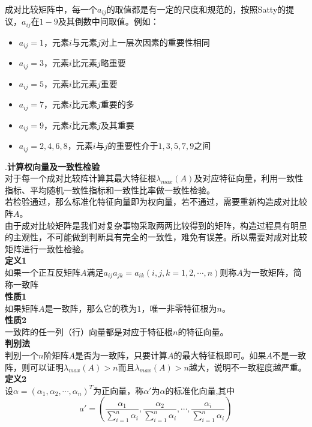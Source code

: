 \documentclass[openany]{progbookcn}
\begin{document}
\indent 成对比较矩阵中，每一个$a_{ij}$的取值都是有一定的尺度和规范的，按照Satty的提议，$a_{ij}$在$1-9$及其倒数中间取值。例如：
\begin{itemize}
\item $a_{ij}=1$，元素$i$与元素$j$对上一层次因素的重要性相同
\item $a_{ij}=3$，元素$i$比元素$j$略重要
\item $a_{ij}=5$，元素$i$比元素$j$重要
\item $a_{ij}=7$，元素$i$比元素$j$重要的多
\item $a_{ij}=9$，元素$i$比元素$j$及其重要 
\item $a_{ij}=2,4,6,8$，元素$i$与$j$的重要性介于$1,3,5,7,9$之间
\end{itemize}
.{\bf 计算权向量及一致性检验}\\
\indent 对于每一个成对比较阵计算其最大特征根$\lambda_{max}(A)$及对应特征向量，利用一致性指标、平均随机一致性指标和一致性比率做一致性检验。\\
\indent 若检验通过，那么标准化特征向量即为权向量，若不通过，需要重新构造成对比较阵$A$。\\
\indent 由于成对比较矩阵是我们对复杂事物采取两两比较得到的矩阵，构造过程具有明显的主观性，不可能做到判断具有完全的一致性，难免有误差。所以需要对成对比较矩阵进行一致性检验。\\
\noindent \textbf{定义1}\\
\indent 如果一个正互反矩阵$A$满足$a_{ij}a_{jk}=a_{ik}(i,j,k=1,2,\cdots,n)$则称$A$为一致矩阵，简称一致阵\\
\noindent \textbf{性质1}\\
\indent 如果矩阵$A$是一致阵，那么它的秩为$1$，唯一非零特征根为$n$。\\
\noindent \textbf{性质2}\\
\indent 一致阵的任一列（行）向量都是对应于特征根$n$的特征向量。\\

\noindent \textbf{判别法}\\
\indent 判别一个$n$阶矩阵$A$是否为一致阵，只要计算$A$的最大特征根即可。如果$A$不是一致阵，则可以证明$\lambda_{max}(A)>n$而且$\lambda_{max}(A)>n$越大，说明不一致程度越严重。\\
\noindent \textbf{定义2}\\
\indent 设$\alpha=(\alpha_1,\alpha_2,\cdots,\alpha_n)^T$为正向量，称$\alpha'$为$\alpha$的标准化向量,其中
\begin{equation}
a'=\left( {\frac{{{\alpha_1}}}{{\sum\nolimits_{i = 1}^n {{\alpha_i}} }},\frac{{{\alpha_2}}}{{\sum\nolimits_{i = 1}^n {{\alpha_i}} }}, \cdots ,\frac{{{\alpha_i}}}{{\sum\nolimits_{i = 1}^n {{\alpha_i}} }}} \right)
\end{equation}
\end{document}
